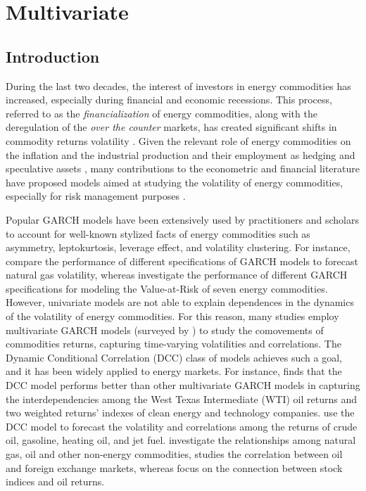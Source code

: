 \chapter{Multivariate}

\section{Introduction}

During the last two decades, the interest of investors in energy commodities has increased, especially during financial and economic recessions.  This process, referred to as the \emph{financialization} of energy commodities, along with the deregulation of the \emph{over the counter} markets, has created significant shifts in commodity returns volatility \citep{masters2008accidental, falkowski2011financialization}. Given the relevant role of energy commodities on the inflation and the industrial production \citep{hamilton1983oil, cunado2003oil} and their employment as hedging and speculative assets \citep{sadorsky1999oil, sadorsky2003macroeconomic, arouri2012impacts, kang2015impact}, many contributions to the econometric and financial literature have proposed models aimed at studying the volatility of energy commodities, especially for risk management purposes \citep{denton2003managing, krehbiel2005price, hung2008estimation, fan2008estimating, aloui2010value}. 

Popular GARCH \citep{bollerslev1986generalized} models  have been extensively used by practitioners and scholars to account for well-known stylized facts of energy commodities such as asymmetry, leptokurtosis, leverage effect, and volatility clustering.  For instance, \cite{LV20135685} compare the performance of different specifications of GARCH models to forecast natural gas {volatility}, whereas \cite{laporta2018selection} investigate the performance of different GARCH specifications for modeling the Value-at-Risk of seven energy commodities.
However, univariate models are not able to explain  dependences in the dynamics of the volatility of energy commodities. For this reason, many studies employ multivariate GARCH models (surveyed by \citealp{Bauwens:Laurent:Rombouts:2006,silvennoinen2009multivariate}) to study the comovements of commodities returns, capturing time-varying volatilities and correlations. The Dynamic Conditional Correlation (DCC) {class of models} \citep{Engle:2002b} achieves such a goal, and it has been widely applied to energy markets. For instance, {\cite{Sadorsky:2012} finds that the DCC model performs better than other multivariate GARCH models in capturing the interdependencies among the West Texas Intermediate (WTI) oil returns and two weighted returns' indexes of clean energy and technology companies. \cite{wang2012forecasting} use the DCC model to forecast the volatility and correlations among the returns of crude oil, gasoline, heating oil, and jet fuel.  \cite{Behmiri:Manera:Nicolini:2019} investigate the relationships among natural gas, oil and other non-energy commodities, }
\cite{mishra2019crude} studies the correlation between oil and foreign exchange markets, whereas \cite{basher2016hedging} focus on the connection between stock indices and oil returns. 

